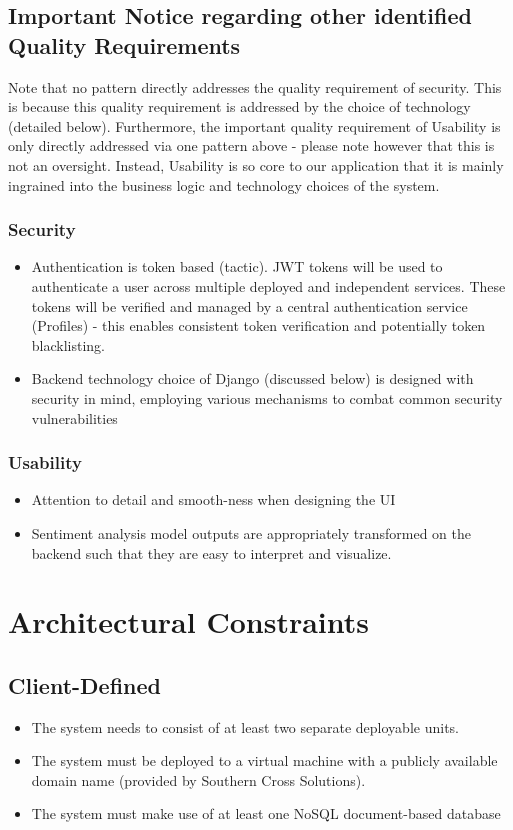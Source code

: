 \documentclass[12pt]{article}
\begin{document}
\subsection{Important Notice regarding other identified Quality Requirements}
Note that no pattern directly addresses the quality requirement of security. This is because this quality requirement is addressed by the choice of technology (detailed below). Furthermore, the important quality requirement of Usability is only directly addressed via one pattern above - please note however that this is not an oversight. Instead, Usability is so core to our application that it is mainly ingrained into the business logic and technology choices of the system.
\subsubsection{Security}
\begin{itemize}
    \item Authentication is token based (tactic). JWT tokens will be used to authenticate a user across multiple deployed and independent services. These tokens will be verified and managed by a central authentication service (Profiles) - this enables consistent token verification and potentially token blacklisting.
    \item Backend technology choice of Django (discussed below) is designed with security in mind, employing various mechanisms to combat common security vulnerabilities
\end{itemize}
\subsubsection{Usability}
\begin{itemize}
    \item Attention to detail and smooth-ness when designing the UI
    \item Sentiment analysis model outputs are appropriately transformed on the backend such that they are easy to interpret and visualize.
\end{itemize}


\newpage
\section{Architectural Constraints}
\subsection{Client-Defined}
\begin{itemize}
    \item The system needs to consist of at least two separate deployable units.
    \item The system must be deployed to a virtual machine with a publicly available domain name (provided by Southern Cross Solutions). 
    \item The system must make use of at least one NoSQL document-based database
\end{itemize}
\end{document}

